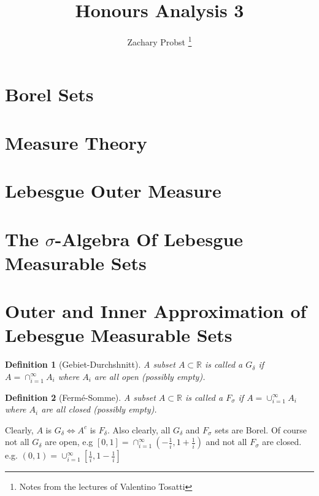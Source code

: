 \documentclass[11pt]{article}
\title{Honours Analysis 3}
\author{Zachary Probst \thanks{Notes from the lectures of Valentino Tosatti}}
\newtheorem{definition}{Definition}[section]
\newcommand{\gdelta}{G_{\delta}}
\newcommand{\fsigma}{F_{\sigma}}
\begin{document}
    \maketitle

    \section{Borel Sets}\label{sec:borel-sets}
    

    \section{Measure Theory}\label{sec:measure-theory}
    

    \section{Lebesgue Outer Measure}\label{sec:lebesgue-outer-measure}
    

    \section{The $\sigma$-Algebra Of Lebesgue Measurable Sets}\label{sec:the-$sigma$-algebra-of-lebesgue-measurable-sets}
    

    \section{Outer and Inner Approximation of Lebesgue Measurable Sets}\label{sec:outer-and-inner-approximation-of-lebesgue-measureable-sets}

    \begin{definition}[Gebiet-Durchshnitt]
        A subset $A \subset \mathbb{R}$ is called a $G_{\delta}$ if $A = \cap_{i=1}^{\infty} A_i$ where $A_i$ are all open (possibly empty).
    \end{definition}

    \begin{definition}[Ferm\'e-Somme]
        A subset $A \subset \mathbb{R}$ is called a $F_\sigma$ if $A = \cup_{i=1}^{\infty} A_i$ where $A_i$ are all closed (possibly empty).
    \end{definition}

    Clearly, $A$ is $G_\delta \iff A^c$ is $F_\delta$.
    Also clearly, all $\gdelta$ and $\fsigma$ sets are Borel.
    Of course not all $\gdelta$ are open, e.g $[0,1] = \cap_{i=1}^{\infty} \left(- \frac{1}{i}, 1 + \frac{1}{i}\right)$ and not all $\fsigma$ are closed.
    e.g. $(0,1) = \cup_{i=1}^{\infty} \left[\frac{1}{i}, 1-\frac{1}{i}\right]$
\end{document}
